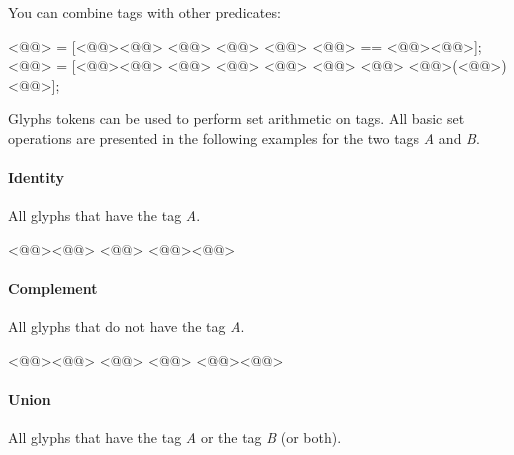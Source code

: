 \noindent You can combine tags with other predicates:

\begin{RichListing}
<@@> = [<@\Token{\$[}@><@@> <@@> <@@> <@@> <@@> == <@@><@\Token{]}@>];
<@@>   = [<@\Token{\$[}@><@@> <@@> <@@> <@@>
                  <@@> <@@> <@@>(<@@>)<@\Token{]}@>];
\end{RichListing}

\noindent Glyphs tokens can be used to perform set arithmetic on tags.
All basic set operations are presented in the following examples for the two tags \emph{A} and \emph{B}.

\paragraph{Identity}%
\label{par:identity}


All glyphs that have the tag \emph{A}.

\begin{RichListing}
<@\Token{\$[}@><@@> <@@> <@@><@\Token{]}@>
\end{RichListing}

\paragraph{Complement}%
\label{par:complement}


All glyphs that do not have the tag \emph{A}.

\begin{RichListing}
<@\Token{\$[}@><@@> <@@> <@@> <@@><@\Token{]}@>
\end{RichListing}

\paragraph{Union}%
\label{par:union}


All glyphs that have the tag \emph{A} or the tag \emph{B} (or both).

